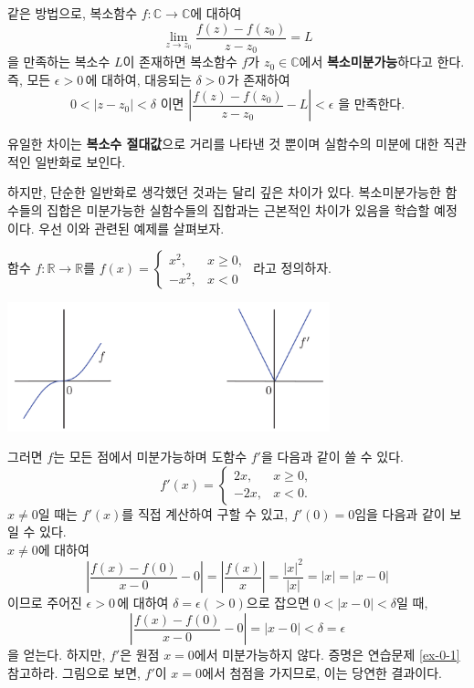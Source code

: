 같은 방법으로, 복소함수 $f:\mathbb C \to \mathbb C$에 대하여
$$
\lim_{z\to z_0} \frac{f(z)-f(z_0)}{z-z_0} = L
$$
을 만족하는 복소수 $L$이 존재하면 
복소함수 $f$가 
$z_0\in \mathbb C$에서 {\bf 복소미분가능}하다고 한다.
즉, 모든 $\epsilon>0\,$에 대하여, 대응되는 $\delta>0\,$가  존재하여
$$
0<|z-z_0|<\delta \text{ 이면 }
\left| \frac{f(z)-f(z_0)}{z-z_0} - L\right| < \epsilon \text{ 을 만족한다.}
$$

유일한 차이는 {\bf 복소수 절대값}으로 거리를 나타낸 것 뿐이며
실함수의 미분에 대한 직관적인 일반화로 보인다.

하지만, 단순한 일반화로 생각했던 것과는 달리 깊은 차이가 있다.
복소미분가능한 함수들의 집합은  미분가능한 실함수들의 집합과는 
근본적인 차이가 있음을 학습할 예정이다.
우선 이와 관련된 예제를 살펴보자.

\begin{saltexample}[label=example-0-1]{}{}
함수 $f:\mathbb R \to \mathbb R$를
$ f(x) = \begin{cases} x^2, & x\ge 0, \\ -x^2, & x<0 \end{cases}$
라고 정의하자.

\saltfigskip
\begin{center}
\includegraphics[width=0.7\textwidth]{./SaltChapter/figs/preface-fig-0-1}
\end{center}
\label{fig:0.1}
\saltfigskip %

그러면 $f$는 모든 점에서 미분가능하며 도함수 $f'$을 다음과 같이 쓸 수 있다.
\begin{equation}\label{eq0.1}
f'(x) = \begin{cases} 2x, & x\ge 0, \\ -2x, & x<0. \end{cases}
\end{equation}
$x\ne0$일 때는 $f'(x)$를 직접 계산하여 구할 수 있고,
$f'(0)=0$임을 다음과 같이 보일 수 있다. \\
$x\ne0$에 대하여
$$
\left| \frac{f(x) - f(0)}{x-0} - 0\right|  = \left| \frac{f(x)}{x}\right| = \frac{|x|^2}{|x|} = |x| = |x-0|
$$
이므로 주어진 $\epsilon>0\,$에 대하여 
$\delta = \epsilon (>0)$으로 잡으면
$0<|x-0|<\delta$일 때, 
$$
\left| \frac{f(x) - f(0)}{x-0} - 0\right|  = |x-0| <\delta = \epsilon
$$
을 얻는다.
하지만, $f'$은 원점 $x=0$에서 미분가능하지 않다.
증명은 연습문제 \ref{ex-0-1}\를 참고하라.
그림으로 보면, $f'$이 $x=0$에서 첨점을 가지므로, 이는 당연한 결과이다.


\end{saltexample}
